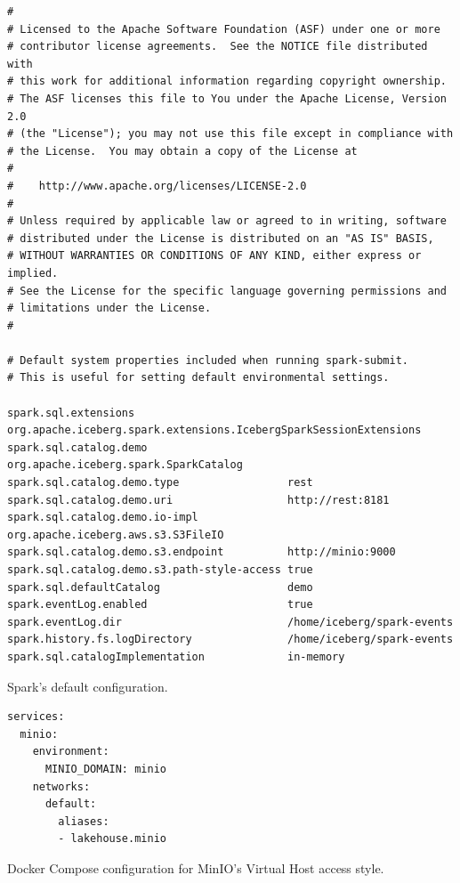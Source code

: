 \begin{listing}[H]
\begin{verbatim}
#
# Licensed to the Apache Software Foundation (ASF) under one or more
# contributor license agreements.  See the NOTICE file distributed with
# this work for additional information regarding copyright ownership.
# The ASF licenses this file to You under the Apache License, Version 2.0
# (the "License"); you may not use this file except in compliance with
# the License.  You may obtain a copy of the License at
#
#    http://www.apache.org/licenses/LICENSE-2.0
#
# Unless required by applicable law or agreed to in writing, software
# distributed under the License is distributed on an "AS IS" BASIS,
# WITHOUT WARRANTIES OR CONDITIONS OF ANY KIND, either express or implied.
# See the License for the specific language governing permissions and
# limitations under the License.
#

# Default system properties included when running spark-submit.
# This is useful for setting default environmental settings.

spark.sql.extensions                        org.apache.iceberg.spark.extensions.IcebergSparkSessionExtensions
spark.sql.catalog.demo                      org.apache.iceberg.spark.SparkCatalog
spark.sql.catalog.demo.type                 rest
spark.sql.catalog.demo.uri                  http://rest:8181
spark.sql.catalog.demo.io-impl              org.apache.iceberg.aws.s3.S3FileIO
spark.sql.catalog.demo.s3.endpoint          http://minio:9000
spark.sql.catalog.demo.s3.path-style-access true
spark.sql.defaultCatalog                    demo
spark.eventLog.enabled                      true
spark.eventLog.dir                          /home/iceberg/spark-events
spark.history.fs.logDirectory               /home/iceberg/spark-events
spark.sql.catalogImplementation             in-memory
\end{verbatim}
\caption{Spark's default configuration.}
\label{lst:spark-defaults}
\end{listing}

\begin{listing}[H]
\begin{verbatim}
services:
  minio:
    environment:
      MINIO_DOMAIN: minio
    networks:
      default:
        aliases:
        - lakehouse.minio
\end{verbatim}
\caption{Docker Compose configuration for MinIO's Virtual Host access style.}
\label{lst:compose-mino-virtual-host}
\end{listing}

